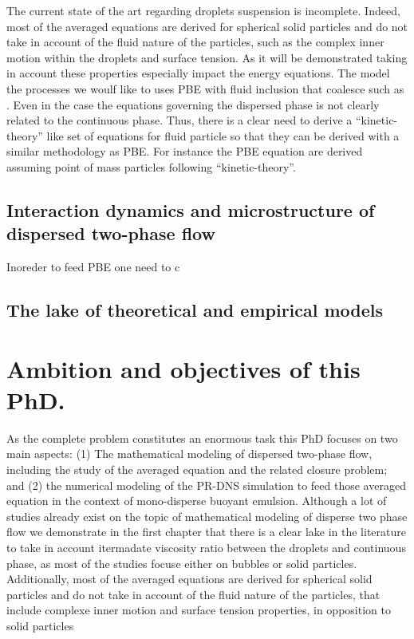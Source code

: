 The current state of the art regarding droplets suspension is incomplete.
Indeed, most of the averaged equations are derived for spherical solid particles and do not take in account of the fluid nature of the particles, such as the complex inner motion within the droplets and surface tension. 
As it will be demonstrated taking in account these properties especially impact the energy equations. 
The model the processes we woulf like to uses PBE with fluid inclusion that coalesce such as \citet{randolph2012theory}. 
Even in the case the equations governing the dispersed phase is not clearly related to the continuous phase. 
Thus, there is a clear need to derive a ``kinetic-theory'' like set of equations for fluid particle so that they can be derived with a similar methodology as PBE. 
For instance the PBE equation are derived assuming point of mass particles following ``kinetic-theory''. 

\subsection{Interaction dynamics and microstructure of dispersed two-phase flow}

Inoreder to feed PBE one need to c

\subsection{The lake of theoretical and empirical models}




\section{Ambition and objectives of this PhD.}




As the complete problem constitutes an enormous task this PhD focuses on two main aspects: 
(1) The mathematical modeling of dispersed two-phase flow, including the study of the averaged equation and the related closure problem; and (2) the numerical modeling of the PR-DNS simulation to feed those averaged equation in the context of mono-disperse buoyant emulsion. 
Although a lot of studies already exist on the topic of mathematical modeling of disperse two phase flow we demonstrate in the first chapter that there is a clear lake in the literature to take in account itermadate viscosity ratio between the droplets and continuous phase, as most of the studies focuse either on bubbles or solid particles.
Additionally, most of the averaged equations are derived for spherical solid
particles and do not take in account of the ﬂuid nature of the particles, that  include complexe inner motion and surface tension properties, in opposition to solid particles



